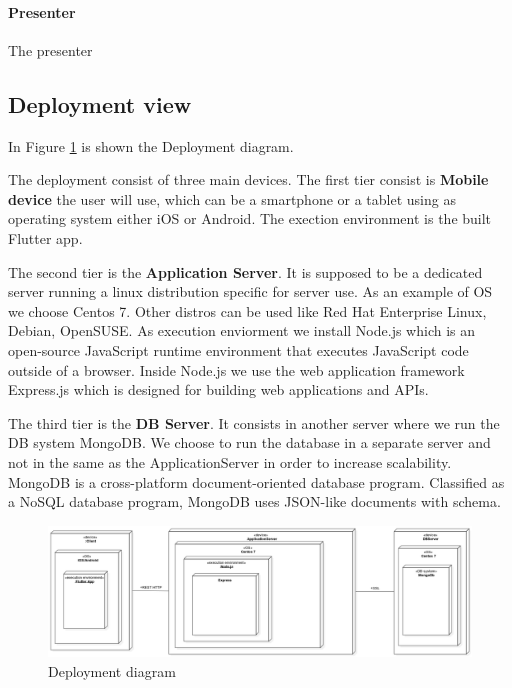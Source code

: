 \paragraph{Presenter}
The presenter












\subsection{Deployment view}

In Figure \ref{fig:deploy} is shown the Deployment diagram.

The deployment consist of three main devices. The first tier consist is \textbf{Mobile device} the user will use, which can be a smartphone or a tablet using as operating system either iOS or Android.
The exection environment is the built Flutter app.


The second tier is the \textbf{Application Server}. It is supposed to be a dedicated server running a linux distribution specific for server use. As an example of OS we choose Centos 7. Other distros can be used like Red Hat Enterprise Linux, Debian, OpenSUSE.
As execution enviorment we install Node.js which is an open-source JavaScript runtime environment that executes JavaScript code outside of a browser. Inside Node.js we use the web application framework Express.js which is designed for building web applications and APIs.


The third tier is the \textbf{DB Server}. It consists in another server where we run the DB system MongoDB. We choose to run the database in a separate server and not in the same as the ApplicationServer in order to increase scalability. MongoDB is a cross-platform document-oriented database program. Classified as a NoSQL database program, MongoDB uses JSON-like documents with schema.



\begin{figure}
\centering
\includegraphics[width=\textwidth]{Images/DeploymentDiagram1.png}
\caption{\label{fig:deploy} Deployment diagram}
\end{figure}




